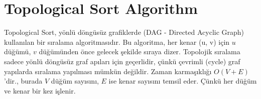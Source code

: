 \section{Topological Sort Algorithm}

Topological Sort, yönlü döngüsüz grafiklerde (DAG - Directed Acyclic Graph) kullanılan bir sıralama algoritmasıdır. Bu algoritma, her kenar (u, v) için  $u$ düğümü, $v$ düğümünden önce gelecek şekilde sıraya dizer. Topolojik sıralama sadece yönlü döngüsüz graf apıları için geçerlidir, çünkü çevrimli (cycle) graf yapılarda sıralama yapılması mümkün değildir. Zaman karmaşıklığı $O(V+E)$'dir., burada $V$ düğüm sayısını, $E$ ise kenar sayısını temsil eder. Çünkü her düğüm ve kenar bir kez işlenir. 

\newpage